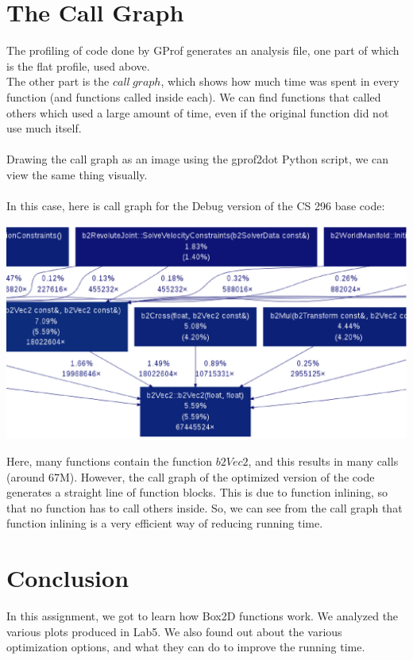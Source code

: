 \documentclass[a4paper,11pt]{article}
\begin{document}
\section*{The Call Graph}
The profiling of code done by GProf generates an analysis file, one part of which is the flat profile, used above.\\
The other part is the $call~graph$, which shows how much time was spent in every function (and functions called inside each). We can find functions that called others which used a large amount of time, even if the original function did not use much itself.\\\\
Drawing the call graph as an image using the gprof2dot Python script, we can view the same thing visually.\\\\

In this case, here is call graph for the Debug version of the CS 296 base code:\\

\begin{center}
\includegraphics[scale=0.6]{doc/output.eps}
\end{center}

Here, many functions contain the function $b2Vec2$, and this results in many calls (around 67M). However, the call graph of the optimized version of the code generates a straight line of function blocks. This is due to function inlining, so that no function has to call others inside. So, we can see from the call graph that function inlining is a very efficient way of reducing running time.

\section{Conclusion}
In this assignment, we got to learn how Box2D functions work. We analyzed the various plots produced in Lab5. We also found out about the various optimization options, and what they can do to improve the running time.
\end{document}
